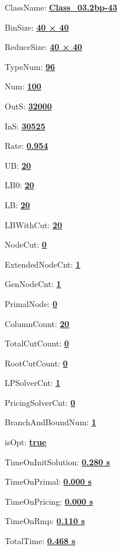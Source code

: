 \documentclass[11pt]{article}
\begin{document}
\pagestyle{empty}


ClassName: \underline{\textbf{Class_03.2bp-43}}
\par
BinSize: \underline{\textbf{40 × 40}}
\par
ReduceSize: \underline{\textbf{40 × 40}}
\par
TypeNum: \underline{\textbf{96}}
\par
Num: \underline{\textbf{100}}
\par
OutS: \underline{\textbf{32000}}
\par
InS: \underline{\textbf{30525}}
\par
Rate: \underline{\textbf{0.954}}
\par
UB: \underline{\textbf{20}}
\par
LB0: \underline{\textbf{20}}
\par
LB: \underline{\textbf{20}}
\par
LBWithCut: \underline{\textbf{20}}
\par
NodeCut: \underline{\textbf{0}}
\par
ExtendedNodeCnt: \underline{\textbf{1}}
\par
GenNodeCnt: \underline{\textbf{1}}
\par
PrimalNode: \underline{\textbf{0}}
\par
ColumnCount: \underline{\textbf{20}}
\par
TotalCutCount: \underline{\textbf{0}}
\par
RootCutCount: \underline{\textbf{0}}
\par
LPSolverCnt: \underline{\textbf{1}}
\par
PricingSolverCnt: \underline{\textbf{0}}
\par
BranchAndBoundNum: \underline{\textbf{1}}
\par
isOpt: \underline{\textbf{true}}
\par
TimeOnInitSolution: \underline{\textbf{0.280 s}}
\par
TimeOnPrimal: \underline{\textbf{0.000 s}}
\par
TimeOnPricing: \underline{\textbf{0.000 s}}
\par
TimeOnRmp: \underline{\textbf{0.110 s}}
\par
TotalTime: \underline{\textbf{0.468 s}}
\par
\newpage


\end{document}

